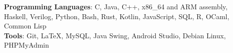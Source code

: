 \textbf{Programming Languages}: C, Java, C++, x86\_64 and ARM assembly, Haskell, Verilog, Python, Bash, Rust, Kotlin, JavaScript, SQL, R, OCaml, Common Lisp\\
\textbf{Tools}: Git, \LaTeX{}, MySQL, Java Swing, Android Studio, Debian Linux, PHPMyAdmin